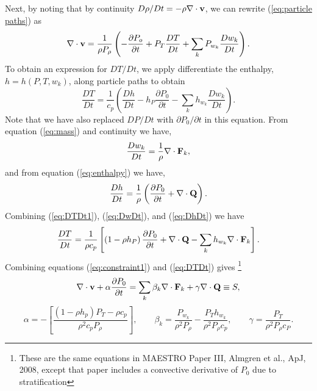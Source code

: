 \documentclass[final]{siamltex}
\def\Fb {{\bf F}}
\def\Qb {{\bf Q}}
\def\vb {{\bf v}}
\begin{document}
Next, by noting that by continuity $D\rho/Dt = -\rho\nabla\cdot\vb$, we can rewrite 
(\ref{eq:particle paths}) as
\begin{equation}
\nabla\cdot\vb = \frac{1}{\rho P_\rho}\left(-\frac{\partial P_o}{\partial t} + P_T\frac{DT}{Dt} + \sum_kP_{w_k}\frac{Dw_k}{Dt}\right).\label{eq:constraint1}
\end{equation}
To obtain an expression for $DT/Dt$, we apply differentiate the enthalpy, $h=h(P,T,w_k)$, 
along particle paths to obtain
\begin{equation}
\frac{DT}{Dt} = \frac{1}{c_p}\left(\frac{Dh}{Dt} - h_P\frac{\partial P_0}{\partial t} - \sum_kh_{w_k}\frac{Dw_k}{Dt}\right).\label{eq:DTDt1}
\end{equation}
Note that we have also replaced $DP/Dt$ with 
$\partial P_0/\partial t$ in this equation.  From equation (\ref{eq:mass}) and 
continuity we have,
\begin{equation}
\frac{Dw_k}{Dt} = \frac{1}{\rho}\nabla\cdot\Fb_k,\label{eq:DwDt}
\end{equation}
and from equation (\ref{eq:enthalpy}) we have,
\begin{equation}
\frac{Dh}{Dt} = \frac{1}{\rho}\left(\frac{\partial P_0}{\partial t} + \nabla\cdot\Qb\right).\label{eq:DhDt}
\end{equation}
Combining (\ref{eq:DTDt1}), (\ref{eq:DwDt}), and (\ref{eq:DhDt}) we have
\begin{equation}
\frac{DT}{Dt} = \frac{1}{\rho c_p}\left[\left(1 - \rho h_P\right)\frac{\partial P_0}{\partial t} + \nabla\cdot\Qb - \sum_kh_{w_k}\nabla\cdot\Fb_k\right].\label{eq:DTDt}
\end{equation}
Combining equations (\ref{eq:constraint1}) and (\ref{eq:DTDt}) gives
\footnote{These are the same equations in MAESTRO Paper III, Almgren et al., ApJ, 2008, except that paper includes a convective derivative of $P_0$ due to stratification}
\begin{equation}
\nabla\cdot\vb + \alpha\frac{\partial P_0}{\partial t} = \sum_k \beta_k \nabla\cdot\Fb_k + \gamma \nabla\cdot\Qb \equiv S,\label{eq:constraint}
\end{equation}
\begin{equation}
\alpha = -\left[\frac{(1-\rho h_p)P_T - \rho c_p}{\rho^2 c_p P_\rho}\right], \qquad
\beta_k = \frac{P_{w_k}}{\rho^2 P_\rho} - \frac{P_T h_{w_k}}{\rho^2 P_\rho c_p}, \qquad
\gamma = \frac{P_T}{\rho^2 P_\rho c_P}.
\end{equation}
\end{document}
